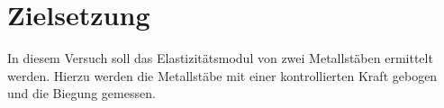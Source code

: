 \section{Zielsetzung}

In diesem Versuch soll das Elastizitätsmodul von zwei Metallstäben ermittelt werden.
Hierzu werden die Metallstäbe mit einer kontrollierten Kraft gebogen und die Biegung gemessen.